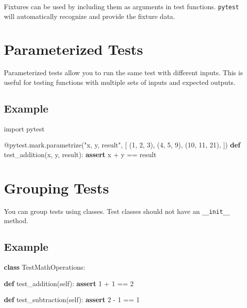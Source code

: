 \documentclass[
  letterpaper,
  DIV=11,
  numbers=noendperiod]{scrreprt}
\newenvironment{Shaded}{\begin{snugshade}}{\end{snugshade}}
\newcommand{\AttributeTok}[1]{\textcolor[rgb]{0.40,0.45,0.13}{#1}}
\newcommand{\ControlFlowTok}[1]{\textcolor[rgb]{0.00,0.23,0.31}{\textbf{#1}}}
\newcommand{\DecValTok}[1]{\textcolor[rgb]{0.68,0.00,0.00}{#1}}
\newcommand{\ImportTok}[1]{\textcolor[rgb]{0.00,0.46,0.62}{#1}}
\newcommand{\KeywordTok}[1]{\textcolor[rgb]{0.00,0.23,0.31}{\textbf{#1}}}
\newcommand{\NormalTok}[1]{\textcolor[rgb]{0.00,0.23,0.31}{#1}}
\newcommand{\OperatorTok}[1]{\textcolor[rgb]{0.37,0.37,0.37}{#1}}
\newcommand{\StringTok}[1]{\textcolor[rgb]{0.13,0.47,0.30}{#1}}
\newcommand{\VariableTok}[1]{\textcolor[rgb]{0.07,0.07,0.07}{#1}}
\begin{document}
Fixtures can be used by including them as arguments in test functions.
\texttt{pytest} will automatically recognize and provide the fixture
data.

\section{Parameterized Tests}\label{parameterized-tests-1}

Parameterized tests allow you to run the same test with different
inputs. This is useful for testing functions with multiple sets of
inputs and expected outputs.

\subsection{Example}\label{example-20}

\begin{Shaded}
\begin{Highlighting}[]
\ImportTok{import}\NormalTok{ pytest}

\AttributeTok{@pytest.mark.parametrize}\NormalTok{(}\StringTok{"x, y, result"}\NormalTok{, [}
\NormalTok{    (}\DecValTok{1}\NormalTok{, }\DecValTok{2}\NormalTok{, }\DecValTok{3}\NormalTok{),}
\NormalTok{    (}\DecValTok{4}\NormalTok{, }\DecValTok{5}\NormalTok{, }\DecValTok{9}\NormalTok{),}
\NormalTok{    (}\DecValTok{10}\NormalTok{, }\DecValTok{11}\NormalTok{, }\DecValTok{21}\NormalTok{),}
\NormalTok{])}
\KeywordTok{def}\NormalTok{ test\_addition(x, y, result):}
    \ControlFlowTok{assert}\NormalTok{ x }\OperatorTok{+}\NormalTok{ y }\OperatorTok{==}\NormalTok{ result}
\end{Highlighting}
\end{Shaded}

\section{Grouping Tests}\label{grouping-tests}

You can group tests using classes. Test classes should not have an
\texttt{\_\_init\_\_} method.

\subsection{Example}\label{example-21}

\begin{Shaded}
\begin{Highlighting}[]
\KeywordTok{class}\NormalTok{ TestMathOperations:}

    \KeywordTok{def}\NormalTok{ test\_addition(}\VariableTok{self}\NormalTok{):}
        \ControlFlowTok{assert} \DecValTok{1} \OperatorTok{+} \DecValTok{1} \OperatorTok{==} \DecValTok{2}

    \KeywordTok{def}\NormalTok{ test\_subtraction(}\VariableTok{self}\NormalTok{):}
        \ControlFlowTok{assert} \DecValTok{2} \OperatorTok{{-}} \DecValTok{1} \OperatorTok{==} \DecValTok{1}
\end{Highlighting}
\end{Shaded}
\end{document}
